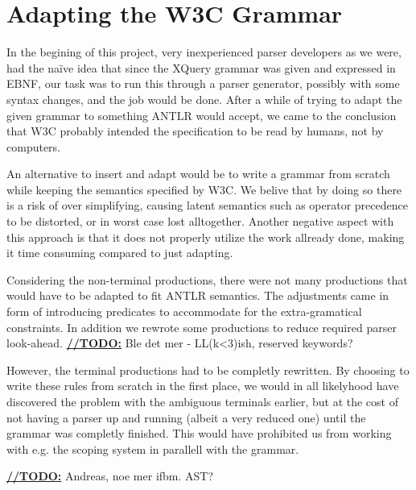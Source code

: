 \section{Adapting the W3C Grammar}
\label{sect:discussion:adaptW3C}

In the begining of this project, very inexperienced parser developers as we were, had the na\"{i}ve idea that since the XQuery grammar was given and expressed in EBNF, our task was to run this through a parser generator, possibly with some syntax changes, and the job would be done. After a while of trying to adapt the given grammar to something ANTLR would accept, we came to the conclusion that W3C probably intended the specification to be read by humans, not by computers.

An alternative to insert and adapt would be to write a grammar from scratch while keeping the semantics specified by W3C. We belive that by doing so there is a risk of over simplifying, causing latent semantics such as operator precedence to be distorted, or in worst case lost alltogether. Another negative aspect with this approach is that it does not properly utilize the work allready done, making it time consuming compared to just adapting.

Considering the non-terminal productions, there were not many productions that would have to be adapted to fit ANTLR semantics. The adjustments came in form of introducing predicates to accommodate for the extra-gramatical constraints. In addition we rewrote some productions to reduce required parser look-ahead. \underline{\textbf{\LARGE //TODO:}} Ble det mer - LL(k<3)ish, reserved keywords?

However, the terminal productions had to be completly rewritten. By choosing to write these rules from scratch in the first place, we would in all likelyhood have discovered the problem with the ambiguous terminals earlier, but at the cost of not having a parser up and running (albeit a very reduced one) until the grammar was completly finished. This would have prohibited us from working with e.g. the scoping system in parallell with the grammar.

\underline{\textbf{\LARGE //TODO:}} Andreas, noe mer ifbm. AST?